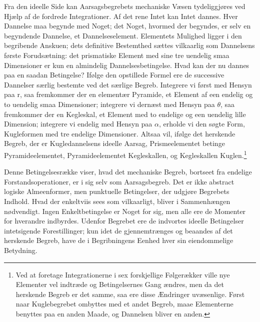 \documentclass[12pt,a4paper]{book}
\begin{document}
Fra den ideelle Side kan Aarsagsbegrebets mechaniske Væsen
tydeliggjøres ved Hjælp af de fordrede Integrationer. Af det rene Intet
kan Intet dannes. Hver Dannelse maa begynde med Noget; det Noget,
hvormed der begyndes, er selv en begyndende Dannelse, et
Dannelseselement. Elementets Mulighed ligger i den begribende Anskuen;
dets definitive Bestemthed sættes vilkaarlig som Dannelsens første
Forudsætning: det prismatiske Element med sine tre uendelig smaa
Dimensioner er kun en almindelig Dannelsesbetingelse. Hvad kan der nu
dannes paa en saadan Betingelse? Ifølge den opstillede Formel ere de
successive Dannelser særlig bestemte ved det særlige Begreb. Integrere
vi først med Hensyn paa r, saa fremkommer der en elementær Pyramide, et
Element af een endelig og to uendelig smaa Dimensioner; integrere vi
dernæst med Hensyn paa $\theta$, saa fremkommer der en Kegleskal, et
Element med to endelige og een uendelig lille Dimension; integrere vi
endelig med Hensyn paa $\alpha$,
erholde vi den søgte Form, Kugleformen med tre endelige Dimensioner.
Altsaa vil, ifølge det herskende Begreb, der er Kugledannelsens ideelle
Aarsag, Prismeelementet betinge Pyramideelementet, Pyramideelementet
Kegleskallen, og Kegleskallen Kuglen.\footnote{%
Ved at foretage Integrationerne i sex forskjellige Følgerækker ville
nye Elementer vel indtræde og Betingelsernes Gang ændres, men da det
herskende Begreb er det samme, saa ere disse Ændringer uvæsenlige.
Først naar Kuglebegrebet ombyttes med et andet Begreb, maae Elementerne
benyttes paa en anden Maade, og Dannelsen bliver en anden.}

Denne Betingelsesrække viser, hvad det mechaniske Begreb, bortseet fra
endelige Forstandsoperationer, er i sig selv som Aarsagsbegreb. Det er
ikke abstract logiske Almeenformer, men punktuelle Betingelser, der
udgjøre Begrebets Indhold. Hvad der enkeltviis sees som vilkaarligt,
bliver i Sammenhængen nødvendigt. Ingen Enkeltbetingelse er Noget for
sig, men alle ere de Momenter for hverandre indbyrdes. Udenfor
Begrebet ere de indvortes ideelle Betingelser intetsigende
Forestillinger; kun idet de gjennemtrænges og beaandes af det herskende
Begreb, have de i Begribningens Eenhed hver sin eiendommelige
Betydning.
\end{document}
